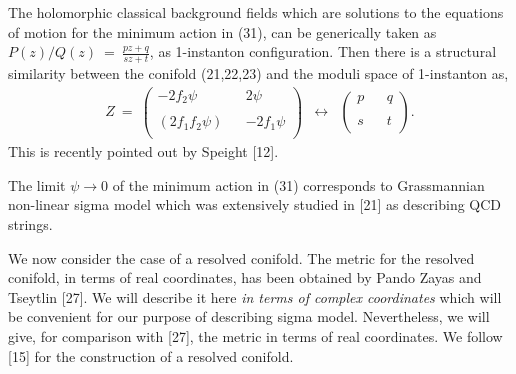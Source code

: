 \documentclass[a4paper,12pt]{article}
\begin{document}
The holomorphic classical background fields  
which are solutions to the equations of motion for the minimum action in
(31), 
can be 
generically taken as $P(z)/Q(z)\ = \ \frac{pz+q}{sz+t}$, as 1-instanton 
configuration. Then there is a structural similarity between the conifold 
(21,22,23) and the moduli space of 1-instanton as,
\begin{eqnarray}
Z\ =\ \left( \begin{array}{lcr}
-2f_2\psi & & 2\psi \\
 & & \\
(2f_1f_2\psi) & & -2f_1 \psi \\
\end{array} \right) 
&\leftrightarrow & \left( \begin{array}{lcr}
p & & q \\
 & & \\
s & & t \\
\end{array} \right). 
\end{eqnarray}
This is recently pointed out by Speight [12].

\vspace{0.5cm}

The limit $\psi \rightarrow 0$ of the minimum action in (31) corresponds to
Grassmannian non-linear sigma model which was extensively studied in [21] 
as describing QCD strings. 

\vspace{0.5cm}

{} 

\vspace{0.5cm}

We now consider the case of a resolved conifold. 
 The metric for the resolved conifold, in terms of 
real coordinates, has been obtained by Pando Zayas and Tseytlin [27]. We will 
describe it here {\it{in terms of complex coordinates}} which will be 
convenient for our purpose of describing sigma model. 
Nevertheless, we will 
give, for comparison with [27], the metric in terms of real coordinates. 
We follow [15] for the construction of a resolved conifold.

\vspace{0.5cm}
\end{document}
